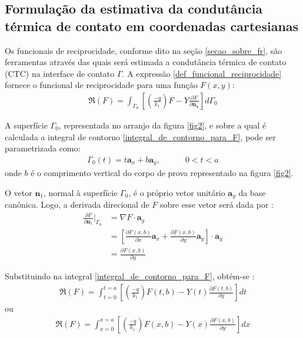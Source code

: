 \subsection{Formulação da estimativa da condutância térmica de contato em coordenadas cartesianas}\label{secao_com_funcionais}

Os funcionais de reciprocidade, conforme dito na seção \ref{secao_sobre_fr}, são ferramentas através das quais será estimada a condutância térmica de contato (CTC) na interface de contato $\Gamma$. A expressão \eqref{def_funcional_reciprocidade} fornece o funcional de reciprocidade para uma função $F(x, y)$:
\begin{align}
\Re(F)
=
\int_{\Gamma_0}\left[\left(\frac{-q}{k_1}\right)F - Y\frac{\partial F}{\partial\mathbf{n_1}}\right]d\Gamma_0
\label{integral_de_contorno_para_F}
\end{align}

A superfície $\Gamma_0$, representada no arranjo da figura \ref{fig2}, e sobre a qual é calculada a integral de contorno \eqref{integral_de_contorno_para_F}, pode ser parametrizada como:
\begin{align}
\Gamma_0(t) = t\mathbf{a}_x + b \mathbf{a}_y, \quad\quad\quad 0 < t < a
\end{align}
onde $b$ é o comprimento vertical do corpo de prova representado na figura \ref{fig2}.

O vetor $\mathbf{n}_1$, normal à superfície $\Gamma_0$, é o próprio vetor unitário $\mathbf{a}_y$ da base canônica. Logo, a derivada direcional de $F$ sobre esse vetor será dada por \citep{livro_stewart}:
\begin{align}
\frac{\partial F}{\partial\mathbf{n}_1}\bigg|_{\Gamma_0} & = \nabla F \cdot \mathbf{a}_y \nonumber \\
& = \left[\frac{\partial F(x, b)}{\partial x}\mathbf{a}_x + \frac{\partial F(x, b)}{\partial y}\mathbf{a}_y \right] \cdot \mathbf{a}_y \nonumber \\
& = \frac{\partial F(x, b)}{\partial y}
\end{align} 

Substituindo na integral \eqref{integral_de_contorno_para_F}, obtém-se \citep{livro_stewart}:
\begin{align}
\Re(F)
=
\int_{t=0}^{t=a} \left[\left(\frac{-q}{k_1}\right)F(t, b) - Y(t)\frac{\partial F(t, b)}{\partial y}\right] dt
\label{integral_de_contorno_para_F_2}
\end{align}
ou
\begin{align}
\Re(F)
=
\int_{x=0}^{x=a} \left[\left(\frac{-q}{k_1}\right)F(x, b) - Y(x)\frac{\partial F(x, b)}{\partial y}\right] dx
\label{integral_de_contorno_para_F_3}
\end{align}

